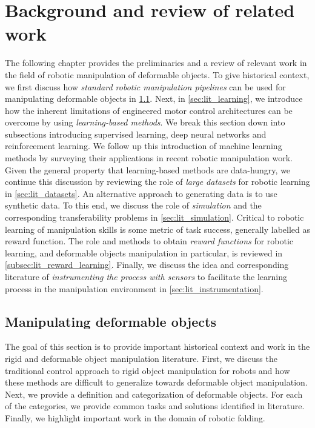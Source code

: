 \documentclass[\home/main.tex]{subfiles}
\begin{document}
\chapter{Background and review of related work} \label{ch:lit}

The following chapter provides the preliminaries and a review of relevant work in the field of robotic manipulation of deformable objects. To give historical context, we first discuss how \emph{standard robotic manipulation pipelines} can be used for manipulating deformable objects in \cref{sec:lit_traditional}. Next, in \cref{sec:lit_learning}, we introduce how the inherent limitations of engineered motor control architectures can be overcome by using \emph{learning-based methods}. We break this section down into subsections introducing supervised learning, deep neural networks and reinforcement learning. We follow up this introduction of machine learning methods by surveying their applications in recent robotic manipulation work. Given the general property that learning-based methods are data-hungry, we continue this discussion by reviewing the role of \emph{large datasets} for robotic learning in \cref{sec:lit_datasets}. An alternative approach to generating data is to use synthetic data. To this end, we discuss the role of \emph{simulation} and the corresponding transferability problems in \cref{sec:lit_simulation}. Critical to robotic learning of manipulation skills is some metric of task success, generally labelled as reward function. The role and methods to obtain \emph{reward functions} for robotic learning, and deformable objects manipulation in particular, is reviewed in \cref{subsec:lit_reward_learning}. Finally, we discuss the idea and corresponding literature of \emph{instrumenting the process with sensors} to facilitate the learning process in the manipulation environment in \cref{sec:lit_instrumentation}.


\section{Manipulating deformable objects} \label{sec:lit_traditional}

The goal of this section is to provide important historical context and work in the rigid and deformable object manipulation literature. First, we discuss the traditional control approach to rigid object manipulation for robots and how these methods are difficult to generalize towards deformable object manipulation. Next, we provide a definition and categorization of deformable objects. For each of the categories, we provide common tasks and solutions identified in literature. Finally, we highlight important work in the domain of robotic folding.
\end{document}
